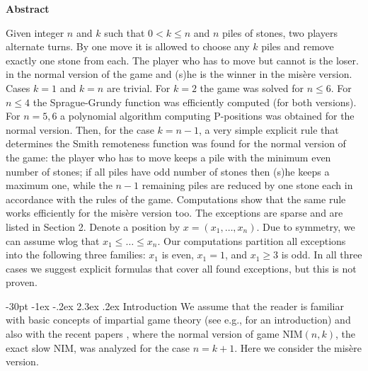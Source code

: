 \documentclass[10pt]{article}
\makeatletter
\renewcommand\section{\@startsection {section}{1}{\z@}
{-30pt \@plus -1ex \@minus -.2ex}
{2.3ex \@plus.2ex}
{\normalfont\normalsize\bfseries\boldmath}}
\theoremstyle{definition}
\makeatother
\begin{document}
\centerline{\bf Abstract}
\noindent
Given integer $n$ and $k$ such that $0 < k \leq n$ 
and  $n$  piles of stones, 
two players alternate turns. 
By one move it is allowed 
to choose any  $k$  piles and remove  
exactly one stone from each.
The player who has to move but cannot is the loser.  
in the normal version of the game and 
(s)he is the winner in the mis\`ere version. 
Cases  $k=1$  and $k = n$  are  trivial. 
For $k=2$  the game was solved for  $n \leq 6$. 
For $n \leq 4$  the Sprague-Grundy function was 
efficiently computed 
(for both %
versions). For $n = 5,6$  a polynomial algorithm 
computing P-positions was obtained 
for the normal version. 
\newline 
Then, for the case  $k = n-1$, 
a very simple explicit rule that 
determines the Smith remoteness function 
was found for the normal version of the game: 
the player who has to move keeps a pile 
with the minimum even number of stones; 
if all piles have odd number of stones 
then (s)he keeps a maximum one, 
while the $n-1$ remaining piles are reduced 
by one stone each in accordance with the rules of the game. 
\newline 
Computations show that the same rule 
works efficiently for the mis\`ere version too.  
The exceptions are sparse and are listed in Section 2.  
Denote a position by  $x = (x_1, \dots, x_n)$.  
Due to symmetry, we can assume wlog that  
$x_1 \leq  \ldots \leq x_n$. 
Our computations partition all exceptions 
into the following three families: 
$x_1$ is even, $x_1 = 1$, and  $x_1 \geq 3$ is odd.
In all three cases we suggest explicit formulas 
that cover all found exceptions, but this is not proven. 
\newline 
{} 

\section{Introduction} 
\label{s0}
We assume that the reader is familiar 
with basic concepts of impartial game theory
(see e.g., \cite{ANW07,BCG01-04} for an introduction) 
and also with the recent papers \cite{GMMV23}, 
where the normal version of 
game NIM$(n,k)$,  the exact slow NIM,   
was analyzed for the case  $n = k+1$.  
Here we consider the mis\`ere version. 
\end{document}
